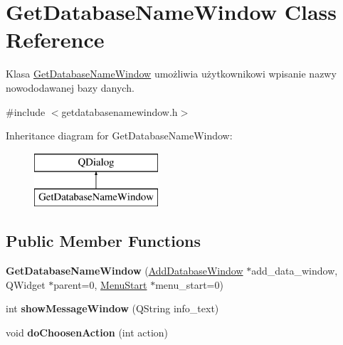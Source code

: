 \hypertarget{class_get_database_name_window}{}\section{Get\+Database\+Name\+Window Class Reference}
\label{class_get_database_name_window}


Klasa \mbox{\hyperlink{class_get_database_name_window}{Get\+Database\+Name\+Window}} umożliwia użytkownikowi wpisanie nazwy nowododawanej bazy danych.  




{\ttfamily \#include $<$getdatabasenamewindow.\+h$>$}

Inheritance diagram for Get\+Database\+Name\+Window\+:\begin{figure}[H]
\begin{center}
\leavevmode
\includegraphics[height=2.000000cm]{class_get_database_name_window}
\end{center}
\end{figure}
\subsection*{Public Member Functions}
\begin{DoxyCompactItemize}
\item 
\mbox{\label{class_get_database_name_window_a6d1276a181f974a3c9a899507a6a7485}} 
{\bfseries Get\+Database\+Name\+Window} (\mbox{\hyperlink{class_add_database_window}{Add\+Database\+Window}} $\ast$add\+\_\+data\+\_\+window, Q\+Widget $\ast$parent=0, \mbox{\hyperlink{class_menu_start}{Menu\+Start}} $\ast$menu\+\_\+start=0)
\item 
\mbox{\label{class_get_database_name_window_adcfec27bffb289f06e18e071e6d87e3d}} 
int {\bfseries show\+Message\+Window} (Q\+String info\+\_\+text)
\item 
\mbox{\label{class_get_database_name_window_adca2353140730e90aa481b44de46f94e}} 
void {\bfseries do\+Choosen\+Action} (int action)
\end{DoxyCompactItemize}



